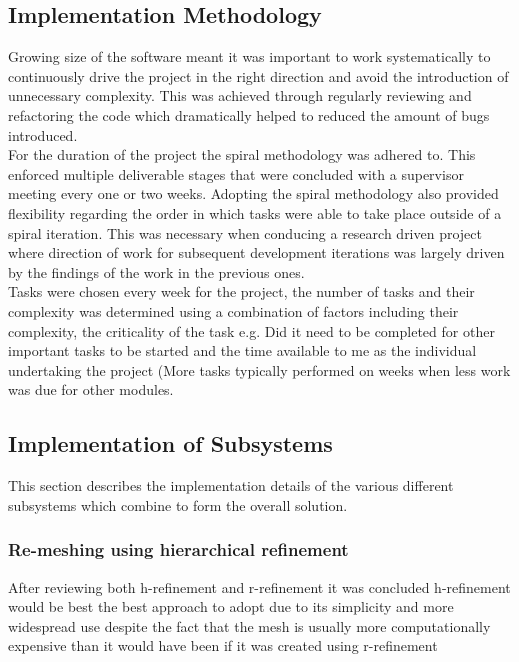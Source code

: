 \subsection{Implementation Methodology}
Growing size of the software meant it was important to work systematically to continuously drive the project in the right direction and avoid the introduction of unnecessary complexity. This was achieved through regularly reviewing and refactoring the code which dramatically helped to reduced the amount of bugs introduced. \\

\noindent
For the duration of the project the spiral methodology was adhered to. This enforced multiple deliverable stages that were concluded with a supervisor meeting every one or two weeks. Adopting the spiral methodology also provided flexibility regarding the order in which tasks were able to take place outside of a spiral iteration. This was necessary when conducing a research driven project where direction of work for subsequent development iterations was largely driven by the  findings of the work in the previous ones. \\

\noindent
Tasks were chosen every week for the project, the number of tasks and their complexity was determined using a combination of factors including their complexity, the criticality of the task e.g. Did it need to be completed for other important tasks to be started and the time available to me as the individual undertaking the project (More tasks typically performed on weeks when less work was due for other modules. \\ 


\subsection{Implementation of Subsystems}
This section describes the implementation details of the various different subsystems which combine to form the overall solution.

\subsubsection{Re-meshing using hierarchical refinement}
After reviewing both h-refinement \cite{HandPRefinements} and r-refinement \cite{RRefinement} it was concluded h-refinement would be best the best approach to adopt due to its simplicity and more widespread use \cite{HandPRefinements} despite the fact that the mesh is usually more computationally expensive than it would have been if it was created using r-refinement \cite{RRefinement}\\ 

